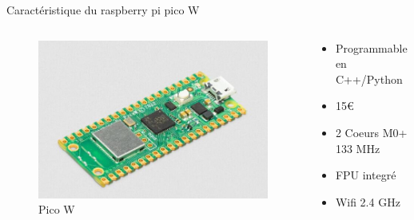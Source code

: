 \documentclass{beamer}
\begin{document}
	\begin{frame}{Caractéristique du raspberry pi pico W} 
		\begin{columns}
			\begin{column}{0.5\textwidth}
				\begin{figure}
					\includegraphics[width=\textwidth]{Image/pico w.jpg}
					\caption{Pico W}
				\end{figure}
			\end{column}
			\begin{column}{0.5\textwidth}
				\begin{itemize}
					\item Programmable en C++/Python 
					\item 15€ 
					\item 2 Coeurs M0+ 133 MHz 
					\item FPU integré
					\item Wifi 2.4 GHz
				\end{itemize}
			\end{column}
		\end{columns}
		
	\end{frame}
\end{document}
